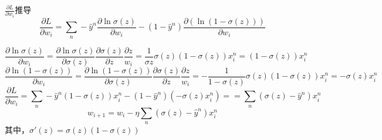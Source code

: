 \begin{myquotation}{$\frac{\partial L}{\partial w_i}$推导}
	\[
	\frac{\partial L}{\partial w_i} = \sum_n -\hat{y}^n \frac{\partial \ln \sigma(z)}{\partial w_i} - (1-\hat{y}^n) \frac{\partial (\ln(1 - \sigma(z)))}{\partial w_i}
	\]

\[
\frac{\partial \ln \sigma(z)}{\partial w_i} = \frac{\partial \ln \sigma(z)}{\partial \sigma(z)} \frac{\partial \sigma(z)}{\partial z} \frac{\partial z}{w_i} = \frac{1}{\sigma z} \sigma(z) (1-\sigma(z)) x^n_i = (1-\sigma(z)) x^n_i
\]
\[
\frac{\partial \ln (1-\sigma(z))}{\partial w_i} = \frac{\partial \ln (1-\sigma(z))}{\partial \sigma(z)} \frac{\partial \sigma(z)}{\partial z} \frac{\partial z}{w_i} = -\frac{1}{1-\sigma(z)} \sigma(z) (1-\sigma(z)) x^n_i =- \sigma(z) x^n_i
\]
\[
\frac{\partial L}{\partial w_i} = \sum_n -\hat{y}^n (1-\sigma(z)) x^n_i - (1-\hat{y}^n) (- \sigma(z) x^n_i) == \sum_n (\sigma(z) - \hat{y}^n) x^n_i
\]
\[
w_{i+1} = w_i - \eta  \sum_n (\sigma(z) - \hat{y}^n) x^n_i
\]
其中，$\sigma '(z) = \sigma(z)(1- \sigma(z))$
\end{myquotation}

